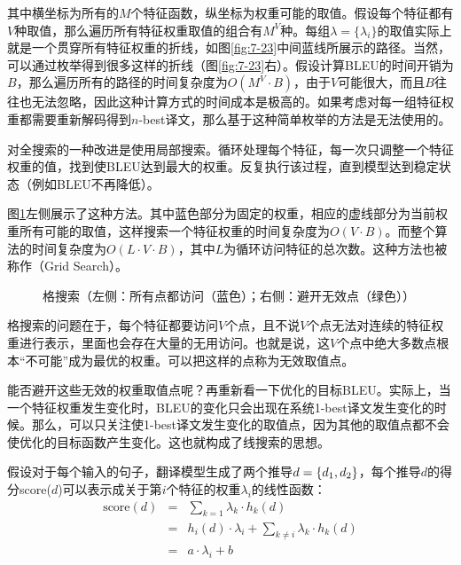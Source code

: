 \parinterval 其中横坐标为所有的$M$个特征函数，纵坐标为权重可能的取值。假设每个特征都有$V$种取值，那么遍历所有特征权重取值的组合有$M^V$种。每组$\lambda = \{\lambda_i\}$的取值实际上就是一个贯穿所有特征权重的折线，如图\ref{fig:7-23}中间蓝线所展示的路径。当然，可以通过枚举得到很多这样的折线（图\ref{fig:7-23}右）。假设计算BLEU的时间开销为$B$，那么遍历所有的路径的时间复杂度为$O(M^V \cdot B)$，由于$V$可能很大，而且$B$往往也无法忽略，因此这种计算方式的时间成本是极高的。如果考虑对每一组特征权重都需要重新解码得到$n$-best译文，那么基于这种简单枚举的方法是无法使用的。

\parinterval 对全搜索的一种改进是使用局部搜索。循环处理每个特征，每一次只调整一个特征权重的值，找到使BLEU达到最大的权重。反复执行该过程，直到模型达到稳定状态（例如BLEU不再降低）。

\parinterval 图\ref{fig:7-24}左侧展示了这种方法。其中蓝色部分为固定的权重，相应的虚线部分为当前权重所有可能的取值，这样搜索一个特征权重的时间复杂度为$O(V \cdot B)$。而整个算法的时间复杂度为$O(L \cdot V \cdot B)$，其中$L$为循环访问特征的总次数。这种方法也被称作{\small{}}（Grid Search）。

\begin{figure}[htp]
\centering

\caption{格搜索（左侧：所有点都访问（蓝色）；右侧：避开无效点（绿色））}
\label{fig:7-24}
\end{figure}

\parinterval 格搜索的问题在于，每个特征都要访问$V$个点，且不说$V$个点无法对连续的特征权重进行表示，里面也会存在大量的无用访问。也就是说，这$V$个点中绝大多数点根本“不可能”成为最优的权重。可以把这样的点称为无效取值点。

\parinterval 能否避开这些无效的权重取值点呢？再重新看一下优化的目标BLEU。实际上，当一个特征权重发生变化时，BLEU的变化只会出现在系统1-best译文发生变化的时候。那么，可以只关注使1-best译文发生变化的取值点，因为其他的取值点都不会使优化的目标函数产生变化。这也就构成了线搜索的思想。

\parinterval 假设对于每个输入的句子，翻译模型生成了两个推导${d} = \{d_1,d_2\}$，每个推导$d$的得分score($d$)可以表示成关于第$i$个特征的权重$\lambda_i$的线性函数：
\begin{eqnarray}
\textrm{score}(d) &=& \sum_{k=1} \lambda_k \cdot h_k (d) \nonumber \\
&=& h_i (d) \cdot \lambda_i + \sum_{k \neq i} \lambda_k \cdot h_k (d) \nonumber \\
&=& a \cdot \lambda_i + b
\label{eq:7-20}
\end{eqnarray}


